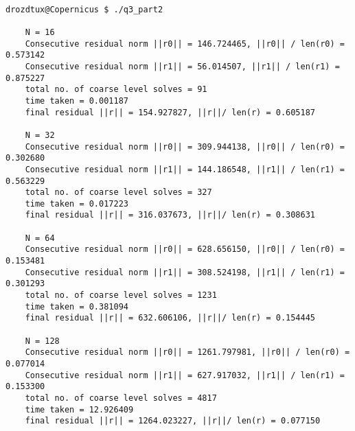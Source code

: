 \documentclass[a4paper]{article}
\begin{document}
\begin{verbatim}

drozdtux@Copernicus $ ./q3_part2

	N = 16
	Consecutive residual norm ||r0|| = 146.724465, ||r0|| / len(r0) = 0.573142
	Consecutive residual norm ||r1|| = 56.014507, ||r1|| / len(r1) = 0.875227
	total no. of coarse level solves = 91
	time taken = 0.001187
	final residual ||r|| = 154.927827, ||r||/ len(r) = 0.605187

	N = 32
	Consecutive residual norm ||r0|| = 309.944138, ||r0|| / len(r0) = 0.302680
	Consecutive residual norm ||r1|| = 144.186548, ||r1|| / len(r1) = 0.563229
	total no. of coarse level solves = 327
	time taken = 0.017223
	final residual ||r|| = 316.037673, ||r||/ len(r) = 0.308631

	N = 64
	Consecutive residual norm ||r0|| = 628.656150, ||r0|| / len(r0) = 0.153481
	Consecutive residual norm ||r1|| = 308.524198, ||r1|| / len(r1) = 0.301293
	total no. of coarse level solves = 1231
	time taken = 0.381094
	final residual ||r|| = 632.606106, ||r||/ len(r) = 0.154445

	N = 128
	Consecutive residual norm ||r0|| = 1261.797981, ||r0|| / len(r0) = 0.077014
	Consecutive residual norm ||r1|| = 627.917032, ||r1|| / len(r1) = 0.153300
	total no. of coarse level solves = 4817
	time taken = 12.926409
	final residual ||r|| = 1264.023227, ||r||/ len(r) = 0.077150

\end{verbatim}



 
 
\end{document}
